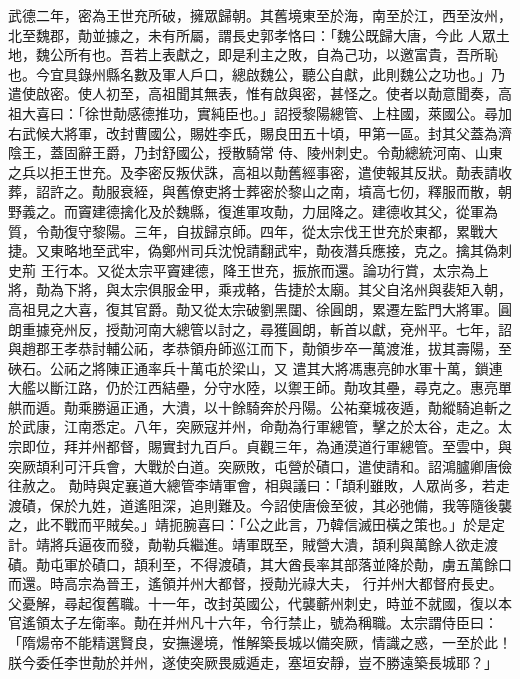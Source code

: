 \begin{pinyinscope}
 武德二年，密為王世充所破，擁眾歸朝。其舊境東至於海，南至於江，西至汝州，北至魏郡，勣並據之，未有所屬，謂長史郭孝恪曰：「魏公既歸大唐，今此
 人眾土地，魏公所有也。吾若上表獻之，即是利主之敗，自為己功，以邀富貴，吾所恥也。今宜具錄州縣名數及軍人戶口，總啟魏公，聽公自獻，此則魏公之功也。」乃遣使啟密。使人初至，高祖聞其無表，惟有啟與密，甚怪之。使者以勣意聞奏，高祖大喜曰：「徐世勣感德推功，實純臣也。」詔授黎陽總管、上柱國，萊國公。尋加右武候大將軍，改封曹國公，賜姓李氏，賜良田五十頃，甲第一區。封其父蓋為濟陰王，蓋固辭王爵，乃封舒國公，授散騎常
 侍、陵州刺史。令勣總統河南、山東之兵以拒王世充。及李密反叛伏誅，高祖以勣舊經事密，遣使報其反狀。勣表請收葬，詔許之。勣服衰絰，與舊僚吏將士葬密於黎山之南，墳高七仞，釋服而散，朝野義之。而竇建德擒化及於魏縣，復進軍攻勣，力屈降之。建德收其父，從軍為質，令勣復守黎陽。三年，自拔歸京師。四年，從太宗伐王世充於東都，累戰大捷。又東略地至武牢，偽鄭州司兵沈悅請翻武牢，勣夜潛兵應接，克之。擒其偽刺史荊
 王行本。又從太宗平竇建德，降王世充，振旅而還。論功行賞，太宗為上將，勣為下將，與太宗俱服金甲，乘戎輅，告捷於太廟。其父自洺州與裴矩入朝，高祖見之大喜，復其官爵。勣又從太宗破劉黑闥、徐圓朗，累遷左監門大將軍。圓朗重據兗州反，授勣河南大總管以討之，尋獲圓朗，斬首以獻，兗州平。七年，詔與趙郡王孝恭討輔公祏，孝恭領舟師巡江而下，勣領步卒一萬渡淮，拔其壽陽，至硤石。公祏之將陳正通率兵十萬屯於梁山，又
 遣其大將馮惠亮帥水軍十萬，鎖連大艦以斷江路，仍於江西結壘，分守水陸，以禦王師。勣攻其壘，尋克之。惠亮單舼而遁。勣乘勝逼正通，大潰，以十餘騎奔於丹陽。公祐棄城夜遁，勣縱騎追斬之於武康，江南悉定。八年，突厥寇并州，命勣為行軍總管，擊之於太谷，走之。太宗即位，拜并州都督，賜實封九百戶。貞觀三年，為通漠道行軍總管。至雲中，與突厥頡利可汗兵會，大戰於白道。突厥敗，屯營於磧口，遣使請和。詔鴻臚卿唐儉往赦之。
 勣時與定襄道大總管李靖軍會，相與議曰：「頡利雖敗，人眾尚多，若走渡磧，保於九姓，道遙阻深，追則難及。今詔使唐儉至彼，其必弛備，我等隨後襲之，此不戰而平賊矣。」靖扼腕喜曰：「公之此言，乃韓信滅田橫之策也。」於是定計。靖將兵逼夜而發，勣勒兵繼進。靖軍既至，賊營大潰，頡利與萬餘人欲走渡磧。勣屯軍於磧口，頡利至，不得渡磧，其大酋長率其部落並降於勣，虜五萬餘口而還。時高宗為晉王，遙領并州大都督，授勣光祿大夫，
 行并州大都督府長史。父憂解，尋起復舊職。十一年，改封英國公，代襲蘄州刺史，時並不就國，復以本官遙領太子左衛率。勣在并州凡十六年，令行禁止，號為稱職。太宗謂侍臣曰：「隋煬帝不能精選賢良，安撫邊境，惟解築長城以備突厥，情識之惑，一至於此！朕今委任李世勣於并州，遂使突厥畏威遁走，塞垣安靜，豈不勝遠築長城耶？」




\end{pinyinscope}
